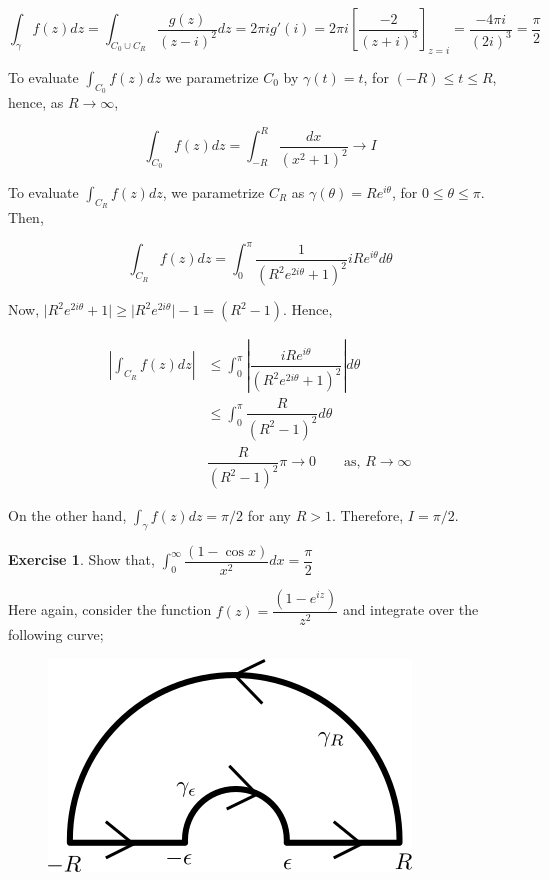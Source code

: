\documentclass[12pt]{article}
\theoremstyle{definition}
\newtheorem{ex}{Exercise}
\newenvironment{exercise}{
\begin{tcolorbox}[colback=red!5!white,colframe=red!75!black, parbox = false]\begin{ex} }{\end{ex}\end{tcolorbox} }
\begin{document}
$$
\int_{\gamma} f(z)dz = \int_{C_0 \cup C_R} \dfrac{g(z)}{(z - i)^2}dz = 2\pi i g'(i) = 2\pi i \left[ \dfrac{-2}{(z + i)^3} \right]_{z = i} = \dfrac{-4\pi i}{(2i)^3} = \dfrac{\pi}{2}
$$

To evaluate $\int_{C_0} f(z)dz$ we parametrize $C_0$ by $\gamma(t) =t$, for $(-R) \leq t \leq R$, hence, as $R \rightarrow \infty$,

$$\int_{C_0} f(z)dz = \int_{-R}^{R} \dfrac{dx}{(x^2 + 1)^2} \rightarrow I$$

To evaluate $\int_{C_R} f(z)dz$, we parametrize $C_R$ as $\gamma(\theta) = Re^{i\theta}$, for $0 \leq \theta \leq \pi$. Then,

$$
\int_{C_R} f(z)dz = \int_{0}^{\pi} \dfrac{1}{(R^2 e^{2i\theta} + 1)^2} iRe^{i\theta}d\theta
$$

Now, $\vert R^2 e^{2i\theta} + 1\vert \geq \vert R^2 e^{2i\theta} \vert - 1 = (R^2 - 1)$. Hence,

\begin{align*}
    \left\vert \int_{C_R} f(z)dz \right\vert
    & \leq \int_{0}^{\pi} \left\vert \dfrac{iRe^{i\theta}}{(R^2 e^{2i\theta} + 1)^2}  \right\vert d\theta\\
    & \leq \int_{0}^{\pi} \dfrac{R}{(R^2 - 1)^2} d\theta\\
    & \dfrac{R}{(R^2 - 1)^2} \pi \rightarrow 0 \qquad \text{as, } R\rightarrow \infty
\end{align*}

On the other hand, $\int_\gamma f(z)dz = \pi/2$ for any $R > 1$. Therefore, $I = \pi/2$.

\begin{exercise}
    Show that, $\int_0^{\infty} \dfrac{(1 - \cos x)}{x^2} dx = \dfrac{\pi}{2}$
\end{exercise}

Here again, consider the function $f(z) = \dfrac{(1 - e^{iz})}{z^2}$ and integrate over the following curve;

\begin{figure}[h]
    \centering
    \includegraphics[width = 0.5\linewidth]{complex-figures/problem-8.png}
\end{figure}
\end{document}
